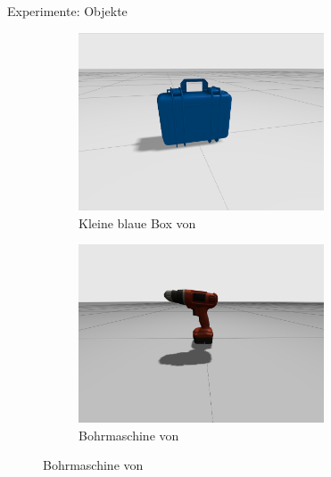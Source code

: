 \documentclass{beamer}
\begin{document}
\begin{frame}{Experimente: Objekte}
\begin{figure}[h]
\begin{subfigure}{0.45\textwidth}
			\centering
			\includegraphics[width=0.8\textwidth]{Graphics/box}
			\caption{Kleine blaue Box von \cite{GazeboFuel-OpenRobotics-Small-Blue-Box}}
		\end{subfigure}
		\begin{subfigure}{0.45\textwidth}
			\centering
			\includegraphics[width=0.8\textwidth]{Graphics/drill}
			\caption{Bohrmaschine von \cite{GazeboFuel-OpenRobotics-Black-and-Decker-Cordless-Drill}}
		\end{subfigure}
	\end{figure}

\end{frame}
\end{document}
